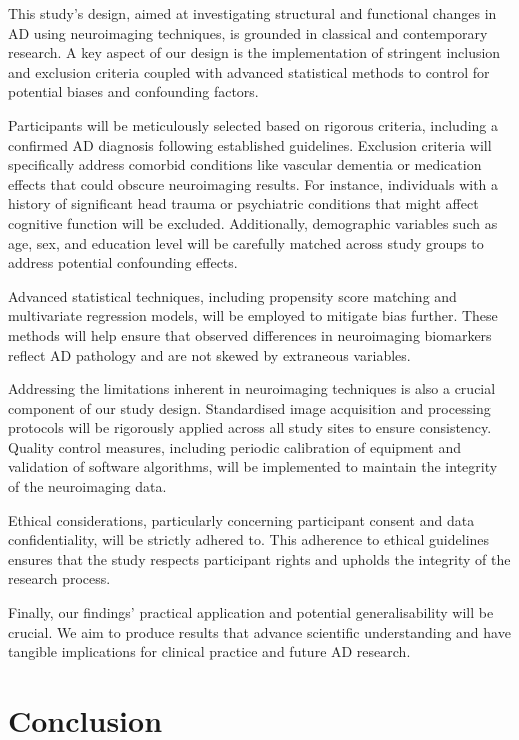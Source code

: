 \documentclass[10pt]{article}
\begin{document}
\begin{sloppypar}
  This study’s design, aimed at investigating structural and functional changes in AD using neuroimaging techniques, is grounded in classical and contemporary research. A key aspect of our design is the implementation of stringent inclusion and exclusion criteria coupled with advanced statistical methods to control for potential biases and confounding factors.

  Participants will be meticulously selected based on rigorous criteria, including a confirmed AD diagnosis following established guidelines. Exclusion criteria will specifically address comorbid conditions like vascular dementia or medication effects that could obscure neuroimaging results. For instance, individuals with a history of significant head trauma or psychiatric conditions that might affect cognitive function will be excluded. Additionally, demographic variables such as age, sex, and education level will be carefully matched across study groups to address potential confounding effects.

  Advanced statistical techniques, including propensity score matching and multivariate regression models, will be employed to mitigate bias further. These methods will help ensure that observed differences in neuroimaging biomarkers reflect AD pathology and are not skewed by extraneous variables.

  Addressing the limitations inherent in neuroimaging techniques is also a crucial component of our study design. Standardised image acquisition and processing protocols will be rigorously applied across all study sites to ensure consistency. Quality control measures, including periodic calibration of equipment and validation of software algorithms, will be implemented to maintain the integrity of the neuroimaging data.

  Ethical considerations, particularly concerning participant consent and data confidentiality, will be strictly adhered to. This adherence to ethical guidelines ensures that the study respects participant rights and upholds the integrity of the research process.

  Finally, our findings’ practical application and potential generalisability will be crucial. We aim to produce results that advance scientific understanding and have tangible implications for clinical practice and future AD research.

  \section{Conclusion}
  \label{sec:conclusion}


\end{sloppypar}
\end{document}
